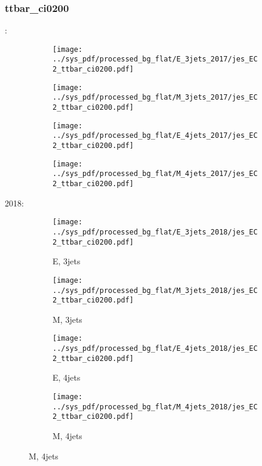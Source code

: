 \documentclass{beamer}
\begin{document}
\begin{frame}
\frametitle{ttbar_ci0200}
\fontsize{5}{1}:
\begin{figure}
\centering
\begin{subfigure}[b]{0.24\textwidth}
\texttt{[image: ../sys\_pdf/processed\_bg\_flat/E\_3jets\_2017/jes\_EC2\_ttbar\_ci0200.pdf]}
\end{subfigure}
\begin{subfigure}[b]{0.24\textwidth}
\texttt{[image: ../sys\_pdf/processed\_bg\_flat/M\_3jets\_2017/jes\_EC2\_ttbar\_ci0200.pdf]}
\end{subfigure}
\begin{subfigure}[b]{0.24\textwidth}
\texttt{[image: ../sys\_pdf/processed\_bg\_flat/E\_4jets\_2017/jes\_EC2\_ttbar\_ci0200.pdf]}
\end{subfigure}
\begin{subfigure}[b]{0.24\textwidth}
\texttt{[image: ../sys\_pdf/processed\_bg\_flat/M\_4jets\_2017/jes\_EC2\_ttbar\_ci0200.pdf]}
\end{subfigure}
\end{figure}
2018:
\begin{figure}
\centering
\begin{subfigure}[b]{0.24\textwidth}
\texttt{[image: ../sys\_pdf/processed\_bg\_flat/E\_3jets\_2018/jes\_EC2\_ttbar\_ci0200.pdf]}
\captionsetup{font=tiny}
\caption{E, 3jets}
\end{subfigure}
\begin{subfigure}[b]{0.24\textwidth}
\texttt{[image: ../sys\_pdf/processed\_bg\_flat/M\_3jets\_2018/jes\_EC2\_ttbar\_ci0200.pdf]}
\captionsetup{font=tiny}
\caption{M, 3jets}
\end{subfigure}
\begin{subfigure}[b]{0.24\textwidth}
\texttt{[image: ../sys\_pdf/processed\_bg\_flat/E\_4jets\_2018/jes\_EC2\_ttbar\_ci0200.pdf]}
\captionsetup{font=tiny}
\caption{E, 4jets}
\end{subfigure}
\begin{subfigure}[b]{0.24\textwidth}
\texttt{[image: ../sys\_pdf/processed\_bg\_flat/M\_4jets\_2018/jes\_EC2\_ttbar\_ci0200.pdf]}
\captionsetup{font=tiny}
\caption{M, 4jets}
\end{subfigure}
\end{figure}
\end{frame}
\end{document}
